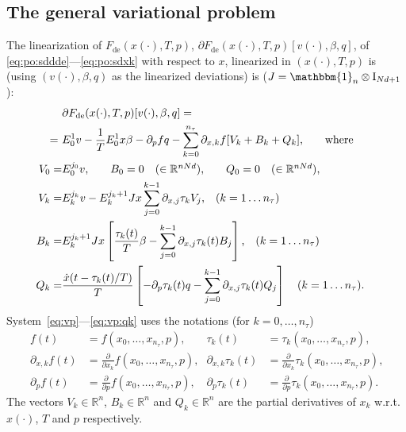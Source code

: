 \documentclass[11pt]{scrartcl}
\newcommand{\mt}[1]{\mathrm{#1}}
\newcommand{\id}{\mt{I}}
\newcommand{\R}{\mathbb{R}}
\begin{document}
\subsection{The general variational problem}
\label{sec:vp}
The linearization of $F_\mathrm{de}(x(\cdot),T,p)$,
$\partial F_\mathrm{de}(x(\cdot),T,p)[v(\cdot),\beta,q]$, of
\eqref{eq:po:sddde}---\eqref{eq:po:sdxk} with respect to $x$,
linearized in $(x(\cdot),T,p)$ is (using $(v(\cdot),\beta,q)$ as the
linearized deviations) is ($J=\mathbbm{1}_n\otimes\id_{Nd+1}$):
\begin{align}\allowdisplaybreaks
  \lefteqn{\partial F_\mathrm{de}(x(\cdot),T,p)[v(\cdot),\beta,q]=}\\
  =\ &E^1_0v-\frac{1}{T}E^1_0x\beta-\partial_{p}fq-
  \sum_{k=0}^{n_\tau}\partial_{x,k}f[V_k+B_k+Q_k]\label{eq:vp}
  \mbox{,\qquad where}\\
  V_0=&E^{j_0}_0v\mbox{,}\qquad
  B_0=0\mbox{\quad ($\in\R^{nNd})$,}\qquad
  Q_0=0\mbox{\quad ($\in\R^{nNd})$,}\\
  V_k=&E^{j_k}_kv-E^{j_k+1}_kJx\sum_{j=0}^{k-1}\partial_{x,j}
  \tau_kV_j\mbox{,\quad($k=1\ldots n_\tau$)}\\
  B_k=&E^{j_k+1}_kJx\left[\frac{\tau_k(t)}{T}\beta-
    \sum_{j=0}^{k-1}\partial_{x,j} \tau_k(t)B_j\right]\mbox{,\quad($k=1\ldots n_\tau$)}\\
  Q_k=&\frac{\dot x(t-\tau_k(t)/T)}{T}\left[-\partial_p\tau_k(t)q-
    \sum_{j=0}^{k-1}\partial_{x,j}
    \tau_k(t)Q_j\right]\mbox{\quad($k=1\ldots
    n_\tau$).}\label{eq:vp:qk}
\end{align}
System~\eqref{eq:vp}---\eqref{eq:vp:qk} uses the notations (for
$k=0,\ldots,n_\tau$)
\begin{align}
    f(t)&=f\left(x_0,\ldots,x_{n_\tau},p\right)\mbox{,}&
    \tau_k(t)&=\tau_k\left(x_0,\ldots,x_{n_\tau},p\right)\mbox{,}\nonumber\\
    \partial_{x,k}f(t)&=\frac{\partial}{\partial
      x_k}f\left(x_0,\ldots,x_{n_\tau},p\right)\mbox{,}&
    \partial_{x,k}\tau_k(t)&=\frac{\partial}{\partial
      x_k}\tau_k\left(x_0,\ldots,x_{n_\tau},p\right)\mbox{,}\label{eq:vp:ft}\\
    \partial_pf(t)&=\frac{\partial}{\partial
      p}f\left(x_0,\ldots,x_{n_\tau},p\right)\mbox{,}&
    \partial_p\tau_k(t)&=\frac{\partial}{\partial
      p}\tau_k\left(x_0,\ldots,x_{n_\tau},p\right)\mbox{.}\nonumber
\end{align}
The vectors $V_k\in\R^n$, $B_k\in\R^n$ and $Q_k\in\R^n$ are the
partial derivatives of $x_k$ w.r.t.\ $x(\cdot)$, $T$ and $p$
respectively.
\end{document}
